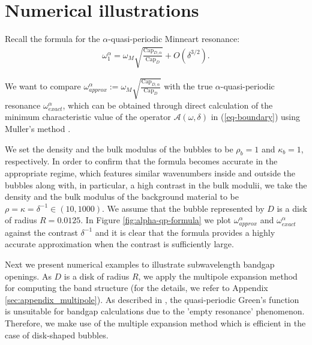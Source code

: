 \documentclass[11pt]{article}
\numberwithin{equation}{section}
\def\capacity{{\mathrm{Cap}}}
\newcommand\1{{\ensuremath {\mathds 1} }}
\begin{document}
{{\section{Numerical illustrations} \label{sec-3}
Recall the formula for the $\alpha$-quasi-periodic Minneart resonance:
\begin{align*}
\omega_1^\alpha = \omega_M \sqrt{\frac{\capacity_{D,\alpha}}{\capacity_D}} + O(\delta^{3/2}). \label{o_1_alpha}
\end{align*}

We want to compare $\omega_{approx}^\alpha:= \omega_M \sqrt{\frac{\capacity_{D,\alpha}}{\capacity_D}}$ with the true $\alpha$-quasi-periodic resonance $\omega_{exact}^\alpha$, which can be obtained through direct calculation of the minimum characteristic value of the operator $\mathcal{A}(\omega, \delta)$ in (\ref{eq-boundary}) using Muller's method \cite{H3a}.

We set the density and the bulk modulus of the bubbles to be $\rho_b = 1$ and $\kappa_b = 1$, respectively. In order to confirm that the formula becomes accurate in the appropriate regime, which features similar wavenumbers inside and outside the bubbles along with, in particular, a high contrast in the bulk modulii, we take the density and the bulk modulus of the background material to be $\rho = \kappa = \delta^{-1} \in (10, 1000)$. We assume that the bubble represented by $D$ is a disk of radius  $R= 0.0125$. In Figure \ref{fig:alpha-qp-formula} we plot $\omega_{approx}^\alpha$ and $\omega_{exact}^\alpha$ against the contrast $\delta^{-1}$ and it is clear that the formula provides a highly accurate approximation when the contrast is sufficiently large.

\medskip



Next we present numerical examples to illustrate subwavelength bandgap openings. As $D$ is a  disk of radius $R$, we apply the multipole expansion method for computing the band structure (for the details, we refer to Appendix \ref{sec:appendix_multipole}). As described in \cite{leslie}, the quasi-periodic Green's function is unsuitable for bandgap calculations due to the 'empty resonance' phenomenon. Therefore, we make use of the multiple expansion method which is efficient in the case of disk-shaped bubbles. 

}}
\end{document}
